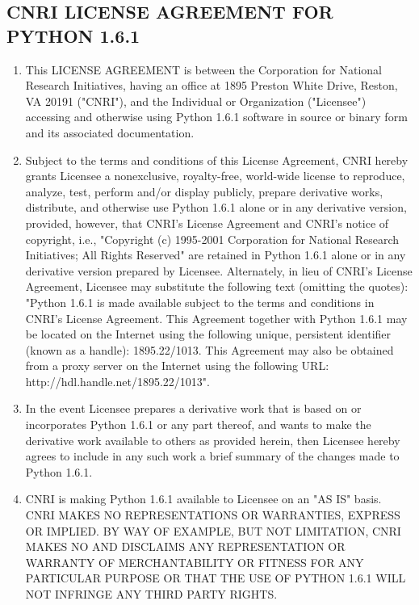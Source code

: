 \subsection{CNRI LICENSE AGREEMENT FOR PYTHON 1.6.1}

\begin{enumerate}
\item This LICENSE AGREEMENT is between the Corporation for National
Research Initiatives, having an office at 1895 Preston White Drive,
Reston, VA 20191 ("CNRI"), and the Individual or Organization
("Licensee") accessing and otherwise using Python 1.6.1 software in
source or binary form and its associated documentation.

\item Subject to the terms and conditions of this License Agreement, CNRI
hereby grants Licensee a nonexclusive, royalty-free, world-wide
license to reproduce, analyze, test, perform and/or display publicly,
prepare derivative works, distribute, and otherwise use Python 1.6.1
alone or in any derivative version, provided, however, that CNRI's
License Agreement and CNRI's notice of copyright, i.e., "Copyright (c)
1995-2001 Corporation for National Research Initiatives; All Rights
Reserved" are retained in Python 1.6.1 alone or in any derivative
version prepared by Licensee.  Alternately, in lieu of CNRI's License
Agreement, Licensee may substitute the following text (omitting the
quotes): "Python 1.6.1 is made available subject to the terms and
conditions in CNRI's License Agreement.  This Agreement together with
Python 1.6.1 may be located on the Internet using the following
unique, persistent identifier (known as a handle): 1895.22/1013.  This
Agreement may also be obtained from a proxy server on the Internet
using the following URL: http://hdl.handle.net/1895.22/1013".

\item In the event Licensee prepares a derivative work that is based on
or incorporates Python 1.6.1 or any part thereof, and wants to make
the derivative work available to others as provided herein, then
Licensee hereby agrees to include in any such work a brief summary of
the changes made to Python 1.6.1.

\item CNRI is making Python 1.6.1 available to Licensee on an "AS IS"
basis.  CNRI MAKES NO REPRESENTATIONS OR WARRANTIES, EXPRESS OR
IMPLIED.  BY WAY OF EXAMPLE, BUT NOT LIMITATION, CNRI MAKES NO AND
DISCLAIMS ANY REPRESENTATION OR WARRANTY OF MERCHANTABILITY OR FITNESS
FOR ANY PARTICULAR PURPOSE OR THAT THE USE OF PYTHON 1.6.1 WILL NOT
INFRINGE ANY THIRD PARTY RIGHTS.


\end{enumerate}
